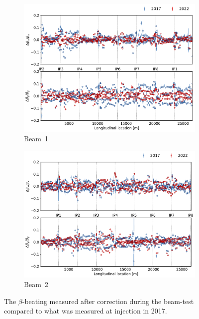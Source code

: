 \documentclass[a4paper]{cernatsnote}
\begin{document}
\begin{figure}[ht]
\begin{subfigure}{.5\textwidth}
  \centering
  \includegraphics[width=.99\linewidth]{plots/beam1/after_corr_2017_vs_2021.pdf}  
  \caption{Beam~1}
\end{subfigure}
\begin{subfigure}{.5\textwidth}
  \centering
  \includegraphics[width=.99\linewidth]{plots/beam2/after_corr_2017_vs_2021_beam2.pdf}  
  \caption{Beam~2}
\end{subfigure}
\caption{The $\beta$-beating measured after correction during the beam-test compared to what was measured at injection in 2017.}
\label{fig:2017_beta_beat_vs_2021}
\end{figure}
\end{document}
